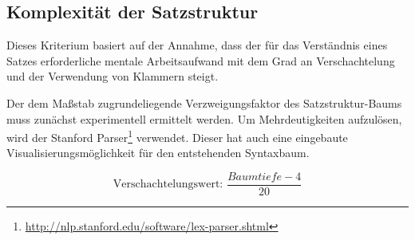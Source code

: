 \documentclass[10pt,a4paper]{article}
\begin{document}
	\subsection*{Komplexität der Satzstruktur}
	Dieses Kriterium basiert auf der Annahme, dass der für das Verständnis eines Satzes erforderliche mentale Arbeitsaufwand mit dem Grad an Verschachtelung und der Verwendung von Klammern steigt. 
	
	Der dem Maßstab zugrundeliegende Verzweigungsfaktor des Satzstruktur-Baums muss zunächst experimentell ermittelt werden. Um Mehrdeutigkeiten aufzulösen, wird der Stanford Parser\footnote{\url{http://nlp.stanford.edu/software/lex-parser.shtml}} verwendet. Dieser hat auch eine eingebaute Visualisierungsmöglichkeit für den entstehenden Syntaxbaum.
	
	\begin{equation*}
		\text{Verschachtelungswert: } \frac{Baumtiefe-4}{20}
	\end{equation*}
		
	
\end{document}
